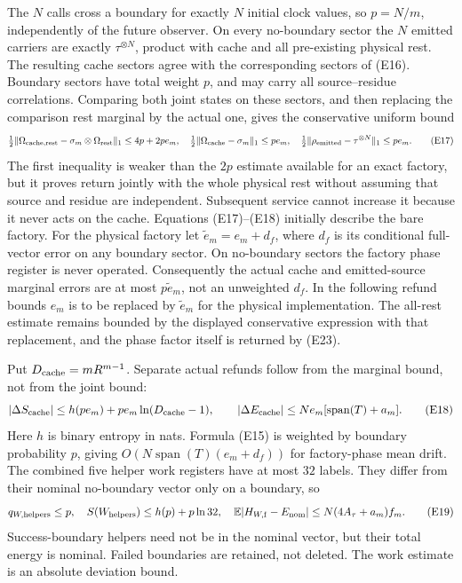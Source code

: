 The \(N\) calls cross a boundary for exactly \(N\) initial clock
values, so \(p=N/m\), independently of the future observer.
On every no-boundary sector the \(N\) emitted carriers are exactly
\(\tau^{\otimes N}\), product with cache and all pre-existing physical
rest. The resulting cache sectors agree with the corresponding
sectors of (E16). Boundary sectors have total weight \(p\), and may
carry all source--residue correlations. Comparing both joint states
on these sectors, and then replacing the comparison rest marginal
by the actual one, gives the conservative uniform bound
\[
 \tfrac12\|\Omega_{\rm cache,rest}
                  -\sigma_m\otimes\Omega_{\rm rest}\|_1\le4p+2pe_m,
 \quad
 \tfrac12\|\Omega_{\rm cache}-\sigma_m\|_1\le pe_m,
 \quad
 \tfrac12\|\rho_{\rm emitted}-\tau^{\otimes N}\|_1\le pe_m.          \tag{E17}
\]
The first inequality is weaker than the \(2p\) estimate available
for an exact factory, but it proves return jointly with the whole
physical rest without assuming that source and residue are independent.
Subsequent service cannot increase it because it never acts on the cache.
Equations (E17)--(E18) initially describe the bare factory. For the
physical factory let \(\widetilde e_m=e_m+d_f\), where \(d_f\) is its
conditional full-vector error on any boundary sector. On no-boundary
sectors the factory phase register is never operated. Consequently
the actual cache and emitted-source marginal errors are at most
\(p\widetilde e_m\), not an unweighted \(d_f\). In the following
refund bounds \(e_m\) is to be replaced by \(\widetilde e_m\) for
the physical implementation. The all-rest estimate remains bounded
by the displayed conservative expression with that replacement,
and the phase factor itself is returned by (E23).

Put \(D_{\rm cache}=mR^{m-1}\). Separate actual refunds follow from
the marginal bound, not from the joint bound:
\[
 |\Delta S_{\rm cache}|
 \le h(pe_m)+pe_m\ln(D_{\rm cache}-1),\qquad
 |\Delta E_{\rm cache}|
 \le N e_m[\operatorname{span}(T)+a_m].              \tag{E18}
\]
Here \(h\) is binary entropy in nats. Formula (E15) is weighted by
boundary probability \(p\), giving \(O(N\operatorname{span}(T)
(e_m+d_f))\) for factory-phase mean drift.
The combined five helper work registers have at most \(32\) labels.
They differ from their nominal no-boundary vector only on a boundary,
so
\[
 q_{W,\rm helpers}\le p,\quad
 S(W_{\rm helpers})\le h(p)+p\ln32,\quad
 \mathbb E|H_{W,\rm f}-E_{\rm nom}|\le N(4A_\tau+a_m) f_m.  \tag{E19}
\]
Success-boundary helpers need not be in the nominal vector, but their
total energy is nominal. Failed boundaries are retained, not deleted.
The work estimate is an absolute deviation bound.

